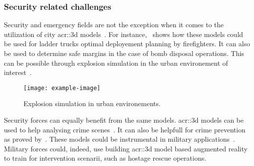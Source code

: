         \subsubsection{Security related challenges}
            Security and emergency fields are not the exception when it comes to the utilization of city \gls{acr::3d} models~\parencite{kwan2005emergency, ruppel2011designing}. 
            For instance,~\textcite{chen2014application} shows how these models could be used for ladder trucks optimal deployement planning by firefighters. 
            It can also be used to determine safe margins in the case of bomb disposal operations. 
            This can be possible through explosion simulation in the urban environement of interest~\parencite{willenborg2015simulation}.\\
            \begin{figure}[h]
                \centering
                \texttt{[image: example-image]}             
                \caption{
                    \label{fig::explosion_simulation} Explosion simulation in urban environements.
                }
            \end{figure}
            Security forces can equally benefit from the same models. 
            \gls{acr::3d} models can be used to help analysing crime scenes~\parencite{wolff2009towards}. 
            It can also be helpfull for crime prevention as proved by~\textcite{wolff2008geospatial}. 
            These models could be instrumental in military applications~\textcite{zlatanova2002trends, budroni2010automatic}. 
            Military forces could, indeed, use building \gls{acr::3d} model based augmented reality to train for intervention scenarii, such as hostage rescue operations.

